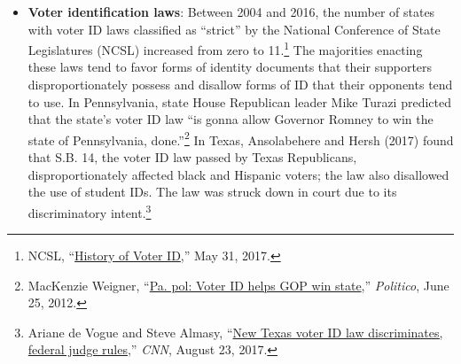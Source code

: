 \documentclass[12pt]{article}
\begin{document}
\begin{itemize}
\item \textbf{Voter identification laws}: Between 2004 and 2016, the number of states with voter ID laws classified as ``strict'' by the National Conference of State Legislatures (NCSL) increased from zero to 11.\footnote{NCSL, ``\href{http://www.ncsl.org/research/elections-and-campaigns/voter-id-history.aspx}{History of Voter ID},'' May 31, 2017.} The majorities enacting these laws tend to favor forms of identity documents that their supporters disproportionately possess and disallow forms of ID that their opponents tend to use. In Pennsylvania, state House Republican leader Mike Turazi predicted that the state's voter ID law ``is gonna allow Governor Romney to win the state of Pennsylvania, done.''\footnote{MacKenzie Weigner, ``\href{https://www.politico.com/story/2012/06/pa-pol-voter-id-helps-gop-win-state-077811}{Pa. pol: Voter ID helps GOP win state},'' \emph{Politico}, June 25, 2012.} In Texas, Ansolabehere and Hersh (2017) found that S.B. 14, the voter ID law passed by Texas Republicans, disproportionately affected black and Hispanic voters; the law also disallowed the use of student IDs. The law was struck down in court due to its discriminatory intent.\footnote{Ariane de Vogue and Steve Almasy, ``\href{https://www.cnn.com/2017/08/23/politics/texas-voter-id-ruling/index.html}{New Texas voter ID law discriminates, federal judge rules},'' \emph{CNN}, August 23, 2017.}


\end{itemize}
\end{document}
